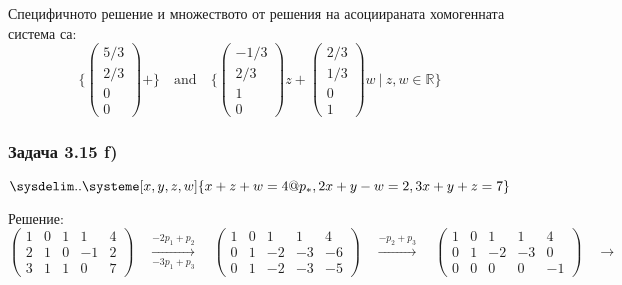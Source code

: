 \documentclass{subfiles}
\begin{document}
\noindent Специфичното решение и множеството от решения на асоциираната хомогенната система са:
\begin{equation*}
    \{
        \left(\begin{array}{ c } 5/3 \\ 2/3 \\ 0 \\ 0 \end{array}\right) +
    \}
    \quad
    \text{and}
    \quad
    \{
        \left(\begin{array}{ c } -1/3 \\ 2/3 \\ 1 \\ 0 \end{array}\right) z +
        \left(\begin{array}{ c } 2/3 \\ 1/3 \\ 0 \\ 1 \end{array}\right) w
        \ |\ z, w \in \mathbb{R}
    \}
\end{equation*}

\subsubsection{Задача 3.15 f)}

\begin{equation*}
    \sysdelim..\systeme[x,y,z,w]{
        x + z + w = 4@p_{*},
        2x + y - w = 2,
        3x + y + z = 7
    }
\end{equation*}

\noindent Решение:
\begin{equation*}
    \left(
        \begin{array}{ cccc|c }
            1 & 0 & 1 &  1 & 4 \\
            2 & 1 & 0 & -1 & 2 \\
            3 & 1 & 1 &  0 & 7
        \end{array}
    \right)
    \quad
    \overset{-2p_{1}+p_{2}}{\underset{-3p_{1}+p_{3}}{\longrightarrow}}
    \quad
    \left(
        \begin{array}{ cccc|c }
            1 & 0 & 1  &  1 & 4 \\
            0 & 1 & -2 & -3 & -6 \\
            0 & 1 & -2 & -3 & -5
        \end{array}
    \right)
    \quad
    \overset{-p_{2}+p_{3}}{\longrightarrow}
    \quad
    \left(
        \begin{array}{ cccc|c }
            1 & 0 & 1  &  1 & 4 \\
            0 & 1 & -2 & -3 & 0 \\
            0 & 0 &  0 &  0 & -1
        \end{array}
    \right)
    \quad
    \longrightarrow
    \quad
\end{equation*}
\end{document}
